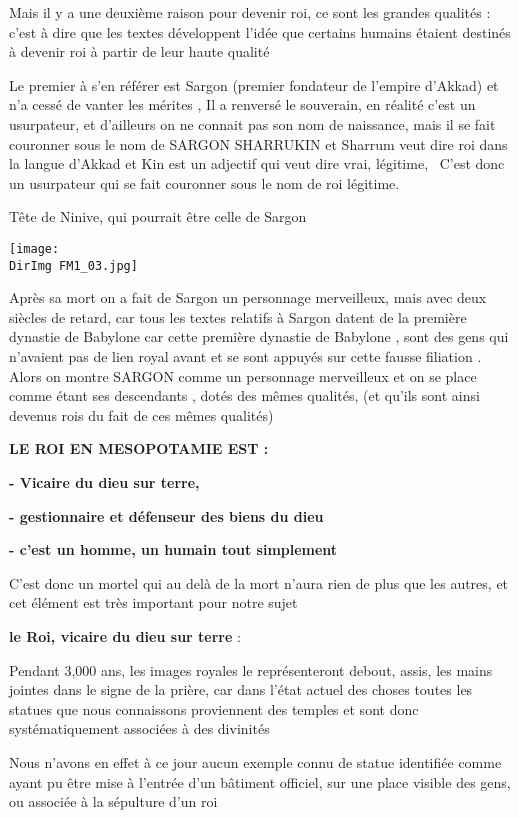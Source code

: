 \documentclass[a4paper]{article}
\newcommand{\DirImg}{../img/FaivreMartin/}
\begin{document}
Mais il y a une deuxième raison pour devenir roi, ce sont les grandes qualités : c'est à dire que les textes développent
l'idée que certains humains étaient destinés à devenir roi à partir de leur haute qualité

Le premier à s'en référer est Sargon (premier fondateur de l'empire d'Akkad) et n'a cessé de vanter les mérites , Il a
renversé le souverain, en réalité c'est un usurpateur, et d'ailleurs on ne connait pas son nom de naissance, mais il se
fait couronner sous le nom de SARGON SHARRUKIN et Sharrum veut dire roi dans la langue d'Akkad et Kin est un adjectif
qui veut dire vrai, légitime, \ C'est donc un usurpateur qui se fait couronner sous le nom de roi légitime.


Tête de Ninive, qui pourrait être celle de Sargon


\texttt{[image: \\DirImg FM1\_03.jpg]} 


Après sa mort on a fait de Sargon un personnage merveilleux, mais avec deux siècles de retard, car tous les textes
relatifs à Sargon datent de la première dynastie de Babylone car cette première dynastie de Babylone , sont des gens
qui n'avaient pas de lien royal avant et se sont appuyés sur cette fausse filiation . Alors on montre SARGON comme un
personnage merveilleux et on se place comme étant ses descendants , dotés des mêmes qualités, (et qu'ils sont ainsi
devenus rois du fait de ces mêmes qualités)

\textbf{LE ROI EN MESOPOTAMIE EST :}


\textbf{- Vicaire du dieu sur terre,}

\textbf{- gestionnaire et défenseur des biens du dieu }

\textbf{- c'est un homme, un humain tout simplement}


C'est donc un mortel qui au delà de la mort n'aura rien de plus que les autres, et cet élément est très important pour
notre sujet


\textbf{le Roi, vicaire du dieu sur terre} : 


Pendant 3,000 ans, les images royales le représenteront debout, assis, les mains jointes dans le signe de la prière, car
dans l'état actuel des choses toutes les statues que nous connaissons proviennent des temples et sont donc
systématiquement associées à des divinités

Nous n'avons en effet à ce jour aucun exemple connu de statue identifiée comme ayant pu être mise à l'entrée d'un
bâtiment officiel, sur une place visible des gens, ou associée à la sépulture d'un roi
\end{document}
